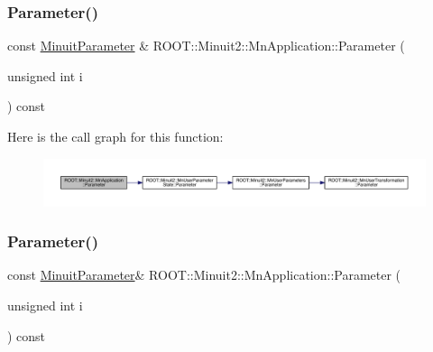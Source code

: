 \subsubsection{\texorpdfstring{Parameter()}{Parameter()}\hspace{0.1cm}{\footnotesize\ttfamily [2/3]}}
{\footnotesize\ttfamily const \mbox{\hyperlink{classROOT_1_1Minuit2_1_1MinuitParameter}{Minuit\+Parameter}} \& R\+O\+O\+T\+::\+Minuit2\+::\+Mn\+Application\+::\+Parameter (\begin{DoxyParamCaption}\item[{unsigned int}]{i }\end{DoxyParamCaption}) const}

Here is the call graph for this function\+:
\nopagebreak
\begin{figure}[H]
\begin{center}
\leavevmode
\includegraphics[width=350pt]{df/dd5/classROOT_1_1Minuit2_1_1MnApplication_a96f1a9c26e3f8c0de67e3680b127c7c1_cgraph}
\end{center}
\end{figure}
\mbox{\label{classROOT_1_1Minuit2_1_1MnApplication_aeb67b1d0ce5b357886d8413c3b166ef2}} 
\subsubsection{\texorpdfstring{Parameter()}{Parameter()}\hspace{0.1cm}{\footnotesize\ttfamily [3/3]}}
{\footnotesize\ttfamily const \mbox{\hyperlink{classROOT_1_1Minuit2_1_1MinuitParameter}{Minuit\+Parameter}}\& R\+O\+O\+T\+::\+Minuit2\+::\+Mn\+Application\+::\+Parameter (\begin{DoxyParamCaption}\item[{unsigned int}]{i }\end{DoxyParamCaption}) const}

\mbox{\label{classROOT_1_1Minuit2_1_1MnApplication_a8a6af4bd7d2f8af8524bca7a67b2f62d}} 
